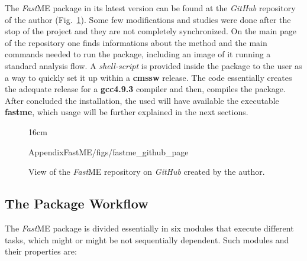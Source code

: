 The \textit{Fast}ME package in its latest version can be found at the \textit{GitHub} repository of the author \cite{bib:fastme_package} (Fig.~\ref{fig:fastme_repo_view}). Some few modifications and studies were done after the stop of the project and they are not completely synchronized. On the main page of the repository one finds informations about the method and the main commands needed to run the package, including an image of it running a standard analysis flow. A \textit{shell-script} is provided inside the package to the user as a way to quickly set it up within a \textbf{cmssw} release. The code essentially creates the adequate release for a \textbf{gcc4.9.3} compiler and then, compiles the package. After concluded the installation, the used will have available the executable \textbf{fastme}, which usage will be further explained in the next sections.
\begin{figure}[htbp]{16cm}
	\caption{View of the \textit{Fast}ME repository on \textit{GitHub} created by the author.}
	\begin{overpic}
		[scale=0.6,trim={0cm 0cm 0cm 0cm},clip]{AppendixFastME/figs/fastme_github_page}
	\end{overpic}
	\label{fig:fastme_repo_view}
\end{figure}


\subsection{The Package Workflow}
The \textit{Fast}ME package is divided essentially in six modules that execute different tasks, which might or might be not sequentially dependent. Such modules and their properties are:

